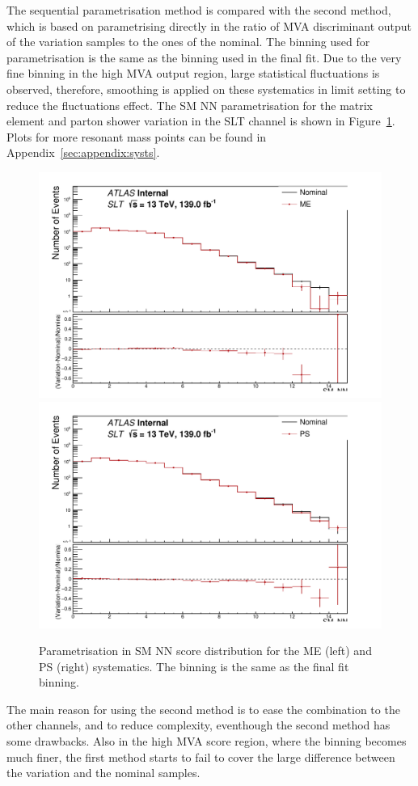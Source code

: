 The sequential parametrisation method is compared with
the second method, which is based on  
parametrising directly in the ratio of MVA discriminant output of the variation samples to the 
ones of the nominal. 
The binning used for parametrisation is the same as the binning used in the final fit. 
Due to the very fine binning in the high MVA output region, 
large statistical fluctuations is observed, therefore,
smoothing is applied on these systematics in limit setting to reduce the fluctuations effect. 
The SM NN parametrisation for the matrix element and parton shower variation in the SLT channel is shown in 
Figure~\ref{fig:ttbarsyst_lephad_SLT_NN}.
Plots for more resonant mass points can be found in Appendix~\ref{sec:appendix:systs}.

\begin{figure}
\centering
\includegraphics[width=.49\textwidth]{figures/lephad_modelling_systs/SLT/ME/limit_binning_SM_NN_Norm}
\includegraphics[width=.49\textwidth]{figures/lephad_modelling_systs/SLT/PS/limit_binning_SM_NN_Norm}\\
\caption{Parametrisation in SM NN score distribution for the ME (left) and PS (right) systematics.
The binning is the same as the final fit binning.}
\label{fig:ttbarsyst_lephad_SLT_NN}
\end{figure}


The main reason for using the second method is to ease the combination to
the other channels, and to reduce complexity, eventhough the second method has some drawbacks. 
Also in the high MVA score region,
where the binning becomes much finer, the first method starts to fail to cover 
the large difference between the variation and the nominal samples.


